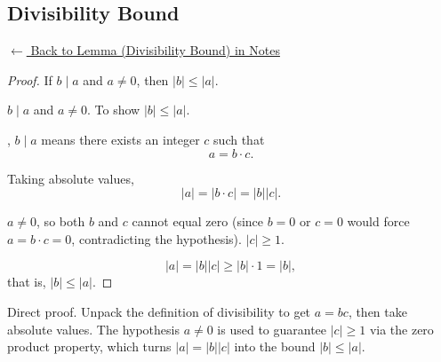 
\subsection*{Divisibility Bound}
\label{prf:div-bound}

\begin{remark*}[Return]
\hyperref[lem:div-bound]{$\leftarrow$ Back to Lemma (Divisibility Bound) in Notes}
\end{remark*}

\begin{proof}
\Claim If $b \mid a$ and $a \neq 0$, then $|b| \leq |a|$.

\Given $b \mid a$ and $a \neq 0$.
\Goal To show $|b| \leq |a|$.

, $b \mid a$ means there exists an integer $c$ such that
\[
  a = b \cdot c.
\]

Taking absolute values,
\[
  |a| = |b \cdot c| = |b||c|.
\]

\ByAss $a \neq 0$, so both $b$ and $c$ cannot equal zero
(since $b = 0$ or $c = 0$ would force $a = b \cdot c = 0$, contradicting the hypothesis).
\Therefore $|c| \geq 1$.

\Hence
\[
  |a| = |b||c| \geq |b| \cdot 1 = |b|,
\]
that is, $|b| \leq |a|$. \AsReq
\end{proof}

\begin{remark*}
Direct proof. Unpack the definition of divisibility to get $a = bc$, then
take absolute values. The hypothesis $a \neq 0$ is used to guarantee $|c| \geq 1$
via the zero product property, which turns $|a| = |b||c|$ into the bound $|b| \leq |a|$.

\end{remark*}

